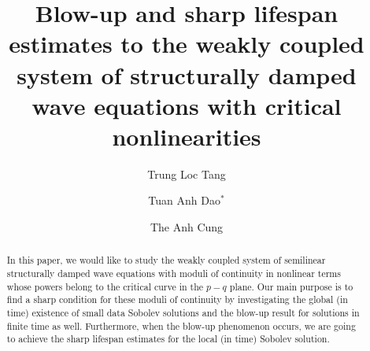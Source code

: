 \documentclass[11pt,reqno]{amsart}
\title{Blow-up and sharp lifespan estimates to the weakly coupled system of structurally damped wave equations with critical nonlinearities}
\numberwithin{equation}{section}
\theoremstyle{plain}
\begin{document}
\author{Trung Loc Tang}
\address{Trung Loc Tang \hfill\break
School of Mathematics and Computer Sciences, Hanoi National University of Education, 136 Xuan Thuy, Hanoi, Vietnam}
\author{Tuan Anh Dao$^*$}
\address{Tuan Anh Dao\hfill \break 
Faculty of Mathematics and Informatics, Hanoi University of Science and Technology, No.1 Dai Co Viet road, Hanoi, Vietnam}
\author{The Anh Cung}
\address{The Anh Cung\hfill \break
Department of Mathematics, Hanoi National University of Education, 136 Xuan Thuy, Hanoi, Vietnam}
\begin{abstract}
   In this paper, we would like to study the weakly coupled system of semilinear structurally damped wave equations with moduli of continuity in nonlinear terms whose powers belong to the critical curve in the $p-q$ plane. Our main purpose is to find a sharp condition for these moduli of continuity by investigating the global (in time) existence of small data Sobolev solutions and the blow-up result for solutions in finite time as well. Furthermore, when the blow-up phenomenon occurs, we are going to achieve the sharp lifespan estimates for the local (in time) Sobolev solution.
\end{abstract}

\maketitle

\end{document}

